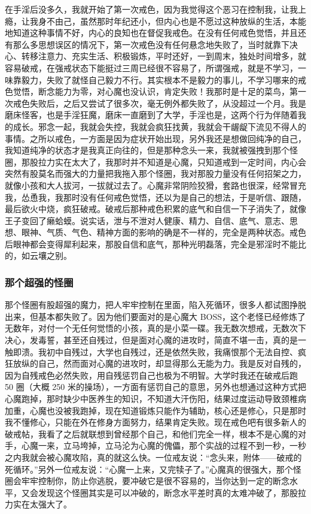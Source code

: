 在手淫后没多久，我就开始了第一次戒色，因为我觉得这个恶习在控制我，让我上瘾，让我身不由己，虽然那时年纪还小，但内心也是不愿过这种放纵的生活，本能地知道这种事情不好，内心的良知也在督促我戒色。在没有任何戒色觉悟，并且还有那么多思想误区的情况下，第一次戒色没有任何悬念地失败了，当时就靠下决心、转移注意力、充实生活、积极锻炼，平时还好，一到周末，独处时间增多，就容易破戒，在强戒状态下能挺过三周已经很不容易了，所谓强戒，就是不学习，一味靠毅力，失败了就怪自己毅力不行。其实根本不是毅力的事儿，不学习哪来的戒色觉悟，断念能力为零，对心魔也没认识，肯定失败！我那时是十足的菜鸟，第一次戒色失败后，之后又尝试了很多次，毫无例外都失败了，从没超过一个月。我是磨床怪客，也是手淫狂魔，磨床一直磨到了大学，手淫也是，这两个行为伴随着我的成长。邪念一起，我就会失控，我就会疯狂找黄，我就会干龌龊下流见不得人的事情。之所以戒色，一方面是因为症状开始出现，另外我还是想做回纯净的自己，我知道纯净的状态才是我真正向往的，但是那种念头一来，我就被强拽到那个怪圈，那股拉力实在太大了，我那时并不知道是心魔，只知道戒到一定时间，内心会突然有股莫名而强大的力量把我拖入那个怪圈，我对那股力量没有任何招架之力，就像小孩和大人拔河，一拔就过去了。心魔非常阴险狡猾，套路也很深，经常冒充我，怂恿我，我那时没有任何戒色觉悟，还以为是自己的想法，于是听信、跟随，最后欲火中烧，疯狂破戒。破戒后那种戒色积累的底气和自信一下子消失了，就像王子变回了癞蛤蟆。说实话，泄与不泄对人健康、精力、自信、底气、意志、思想、眼神、气质、气色、精神方面的影响的确是不一样的，完全是两种状态。戒色后眼神都会变得犀利起来，那股自信和底气，那种光明磊落，完全是邪淫时不能比的，如云壤之别。

\subsubsection{那个超强的怪圈}

那个怪圈有股超强的魔力，把人牢牢控制在里面，陷入死循环，很多人都试图挣脱出来，但基本都失败了。因为他们要面对的是心魔大 BOSS，这个老怪已经修炼了无数年，对付一个无任何觉悟的小孩，真的是小菜一碟。我无数次想戒，无数次下决心，发毒誓，甚至还自残过，但是面对心魔的进攻时，简直不堪一击，真的是一触即溃。我初中自残过，大学也自残过，还是依然失败，我痛恨那个无法自控、疯狂放纵的自己，然而面对心魔的进攻时，却显得那么无能为力。我是反对自残的，因为自残戒色必然失败，用自残惩罚自己也极为不明智。大学时我还在破戒后跑 50 圈（大概 250 米的操场），一方面有惩罚自己的意思，另外也想通过这种方式把心魔跑掉，那时缺少中医养生的知识，不知道大汗伤阳，结果过度运动导致颈椎病加重，心魔也没被我跑掉，现在知道锻炼只能作为辅助，核心还是修心，只是那时我不懂修心，只能在外在修身方面努力，结果肯定失败。现在戒色吧有很多新人的破戒帖，我看了之后就联想到曾经那个自己，和他们完全一样，根本不是心魔的对手，心魔一来，立马垮掉，立马沦为心魔的傀儡，那个实战的过程不到一秒，一秒之内我就会被心魔攻陷，真的就这么快。一位戒友说：“念头来，附体——破戒的死循环。”另外一位戒友说：“心魔一上来，又完犊子了。”心魔真的很强大，那个怪圈会牢牢控制你，防止你逃脱，要冲破它是很不容易的，当你达到一定的断念水平，又会发现这个怪圈其实是可以冲破的，断念水平差时真的太难冲破了，那股拉力实在太强大了。

